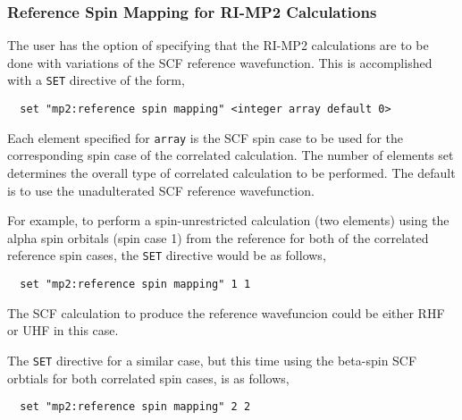 \subsubsection{Reference Spin Mapping for RI-MP2 Calculations}

The user has the option of specifying that the RI-MP2 calculations 
are to be done with variations of the SCF reference wavefunction.  This
is accomplished with a \verb+SET+ directive of the form,

\begin{verbatim}
  set "mp2:reference spin mapping" <integer array default 0>
\end{verbatim}


Each element specified for \verb+array+ is the SCF spin case to be used
for the corresponding spin case of the correlated calculation.  The
number of elements set determines the overall type of correlated
calculation to be performed.  The default is to use the unadulterated
SCF reference wavefunction.  


For example, to perform a spin-unrestricted calculation (two
elements) using the alpha spin orbitals (spin case 1) from the
reference for both of the correlated reference spin cases, the \verb+SET+
directive would be as follows,

\begin{verbatim}
  set "mp2:reference spin mapping" 1 1
\end{verbatim}

The SCF calculation to produce the reference wavefuncion could be either
RHF or UHF in this case.



The \verb+SET+ directive for a similar case, but this time using
the beta-spin SCF orbtials for both correlated spin cases, is as follows,
\begin{verbatim}
  set "mp2:reference spin mapping" 2 2
\end{verbatim}

